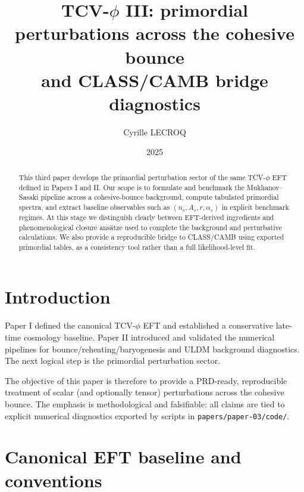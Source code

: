 \documentclass[aps,prd,onecolumn,nofootinbib,superscriptaddress]{revtex4-2}
\begin{document}
\title{TCV-$\phi$ III: primordial perturbations across the cohesive bounce \\
and CLASS/CAMB bridge diagnostics}

\author{Cyrille LECROQ}

\date{2025}

\begin{abstract}
This third paper develops the primordial perturbation sector of the same TCV-$\phi$ EFT defined in Papers I and II.
Our scope is to formulate and benchmark the Mukhanov--Sasaki pipeline across a cohesive-bounce background, compute tabulated primordial spectra, and extract baseline observables such as $(n_s,A_s,r,\alpha_s)$ in explicit benchmark regimes.
At this stage we distinguish clearly between EFT-derived ingredients and phenomenological closure ans\"atze used to complete the background and perturbative calculations.
We also provide a reproducible bridge to CLASS/CAMB using exported primordial tables, as a consistency tool rather than a full likelihood-level fit.
\end{abstract}

\maketitle

\section{Introduction}

Paper I defined the canonical TCV-$\phi$ EFT and established a conservative late-time cosmology baseline.
Paper II introduced and validated the numerical pipelines for bounce/reheating/baryogenesis and ULDM background diagnostics.
The next logical step is the primordial perturbation sector.

The objective of this paper is therefore to provide a PRD-ready, reproducible treatment of scalar (and optionally tensor) perturbations across the cohesive bounce.
The emphasis is methodological and falsifiable: all claims are tied to explicit numerical diagnostics exported by scripts in \texttt{papers/paper-03/code/}.

\section{Canonical EFT baseline and conventions}
\label{sec:eft}
\end{document}
